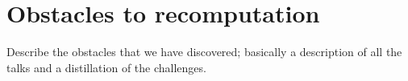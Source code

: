 \section{Obstacles to recomputation}
\label{s:obstacles}

Describe the obstacles that we have discovered; basically a
description of all the talks and a distillation of the challenges.
